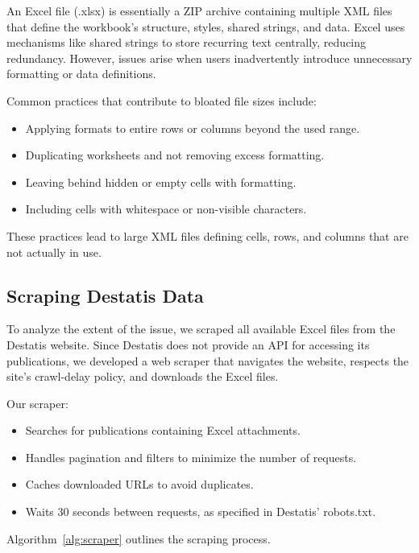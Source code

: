 \documentclass[sigconf]{acmart}
\begin{document}
An Excel file (.xlsx) is essentially a ZIP archive containing multiple XML files that define the workbook's structure, styles, shared strings, and data. Excel uses mechanisms like shared strings to store recurring text centrally, reducing redundancy. However, issues arise when users inadvertently introduce unnecessary formatting or data definitions.

Common practices that contribute to bloated file sizes include:

\begin{itemize}
    \item Applying formats to entire rows or columns beyond the used range.
    \item Duplicating worksheets and not removing excess formatting.
    \item Leaving behind hidden or empty cells with formatting.
    \item Including cells with whitespace or non-visible characters.
\end{itemize}

These practices lead to large XML files defining cells, rows, and columns that are not actually in use.

\subsection{Scraping Destatis Data}

To analyze the extent of the issue, we scraped all available Excel files from the Destatis website. Since Destatis does not provide an API for accessing its publications, we developed a web scraper that navigates the website, respects the site's crawl-delay policy, and downloads the Excel files.

Our scraper:

\begin{itemize}
    \item Searches for publications containing Excel attachments.
    \item Handles pagination and filters to minimize the number of requests.
    \item Caches downloaded URLs to avoid duplicates.
    \item Waits 30 seconds between requests, as specified in Destatis' robots.txt.
\end{itemize}

Algorithm~\ref{alg:scraper} outlines the scraping process.
\end{document}

